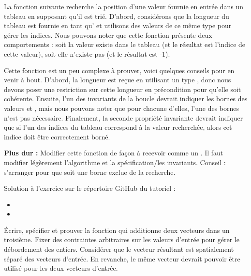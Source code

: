 

\label{l4:statements-loops-ex-bsearch}


La fonction suivante recherche la position d'une valeur fournie en entrée dans
un tableau en supposant qu'il est trié. D'abord, considérons que la
longueur du tableau est fournie en tant qu' et utilisons des valeurs de ce
même type pour gérer les indices. Nous pouvons noter que cette fonction présente
deux comportements : soit la valeur existe dans le tableau (et le résultat est
l'indice de cette valeur), soit elle n'existe pas (et le résultat est -1).




Cette fonction est un peu complexe à prouver, voici quelques conseils
pour en venir à bout. D'abord, la longueur est reçue en utilisant
un type , donc nous devons poser une restriction sur cette longueur en
précondition pour qu'elle soit cohérente. Ensuite, l'un des invariants de la
boucle devrait indiquer les bornes des valeurs  et
, mais nous pouvons noter que pour chacune d'elles, l'une des
bornes n'est pas nécessaire. Finalement, la seconde propriété invariante
devrait indiquer que si l'un des indices du tableau correspond à la valeur
recherchée, alors cet indice doit être correctement borné.


\textbf{Plus dur :} Modifier cette fonction de façon à recevoir 
comme un . Il faut modifier légèrement l'algorithme et
la spécification/les invariants. Conseil : s'arranger pour que 
soit une borne exclue de la recherche.


\begin{Information}
  Solution à l'exercice sur le répertoire GitHub du tutoriel :
  \begin{itemize}
    \item {}
    \item {}
  \end{itemize}
\end{Information}




Écrire, spécifier et prouver la fonction qui additionne deux vecteurs dans un
troisième. Fixer des contraintes arbitraires sur les valeurs d'entrée pour
gérer le débordement des entiers. Considérer que le vecteur résultant est
spatialement séparé des vecteurs d'entrée. En revanche, le même vecteur devrait
pouvoir être utilisé pour les deux vecteurs d'entrée.


